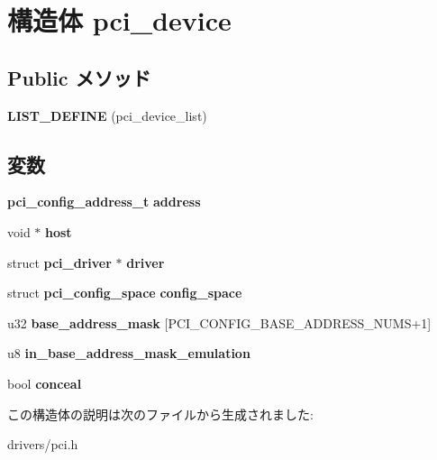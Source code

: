 \section{構造体 pci\-\_\-device}
\label{structpci__device}
\subsection*{\-Public メソッド}
\begin{DoxyCompactItemize}
\item 
{\bfseries \-L\-I\-S\-T\-\_\-\-D\-E\-F\-I\-N\-E} (pci\-\_\-device\-\_\-list)\label{structpci__device_a2ad525ef56c564c3245aea33ec81e30d}

\end{DoxyCompactItemize}
\subsection*{変数}
\begin{DoxyCompactItemize}
\item 
{\bf pci\-\_\-config\-\_\-address\-\_\-t} {\bfseries address}\label{structpci__device_a38e61d43be79357d0cda1a9d035a0110}

\item 
void $\ast$ {\bfseries host}\label{structpci__device_aab00684fa66135ec9687cc6192e28023}

\item 
struct {\bf pci\-\_\-driver} $\ast$ {\bfseries driver}\label{structpci__device_a8c42ea9dafab15170be4786177a45f95}

\item 
struct {\bf pci\-\_\-config\-\_\-space} {\bfseries config\-\_\-space}\label{structpci__device_ae497622b47d64242a8e0a127ea799ac0}

\item 
u32 {\bfseries base\-\_\-address\-\_\-mask} [\-P\-C\-I\-\_\-\-C\-O\-N\-F\-I\-G\-\_\-\-B\-A\-S\-E\-\_\-\-A\-D\-D\-R\-E\-S\-S\-\_\-\-N\-U\-M\-S+1]\label{structpci__device_a6fdc9d5ca3ac1c7c730a4e9c5f112e4f}

\item 
u8 {\bfseries in\-\_\-base\-\_\-address\-\_\-mask\-\_\-emulation}\label{structpci__device_aa9f7e12f82eaf707395a9d022d43e7d0}

\item 
bool {\bfseries conceal}\label{structpci__device_ad2fe3db784d56b33cef430acd55ec198}

\end{DoxyCompactItemize}


この構造体の説明は次のファイルから生成されました\-:\begin{DoxyCompactItemize}
\item 
drivers/pci.\-h\end{DoxyCompactItemize}
